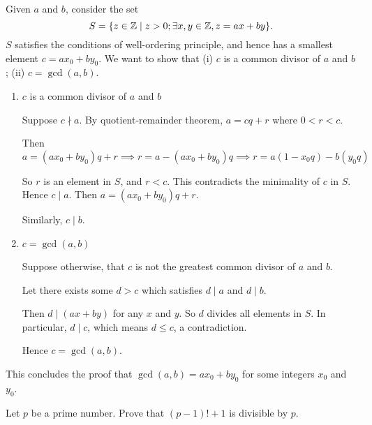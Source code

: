 \begin{solution}
Given $a$ and $b$, consider the set
\[ S=\{z\in\mathbb Z \mid z>0; \exists x,y\in\mathbb Z, z=ax+by\}. \]
$S$ satisfies the conditions of well-ordering principle, and hence has a smallest element $c=ax_0+by_0$. We want to show that (i) $c$ is a common divisor of $a$ and $b$; (ii) $c=\gcd(a,b)$.

\begin{enumerate}[label=(\roman*)]
\item $c$ is a common divisor of $a$ and $b$

Suppose $c\nmid a$. By quotient-remainder theorem, $a=cq+r$ where $0<r<c$.

Then
\[ a=(ax_0+by_0)q+r \implies r=a-(ax_0+by_0)q \implies r=a(1-x_0q)-b(y_0q) \]

So $r$ is an element in $S$, and $r<c$. This contradicts the minimality of $c$ in $S$. Hence $c\mid a$. Then $a=(ax_0+by_0)q+r$.

Similarly, $c\mid b$.

\item $c=\gcd(a,b)$

Suppose otherwise, that $c$ is not the greatest common divisor of $a$ and $b$.

Let there exists some $d>c$ which satisfies $d\mid a$ and $d\mid b$.

Then $d\mid (ax+by)$ for any $x$ and $y$. So $d$ divides all elements in $S$. In particular, $d\mid c$, which means $d \le c$, a contradiction.

Hence $c=\gcd(a,b)$.
\end{enumerate}
This concludes the proof that $\gcd(a,b)=ax_0+by_0$ for some integers $x_0$ and $y_0$.
\end{solution}
\pagebreak

\begin{prbm}
Let $p$ be a prime number. Prove that $(p-1)!+1$ is divisible by $p$.
\end{prbm}

